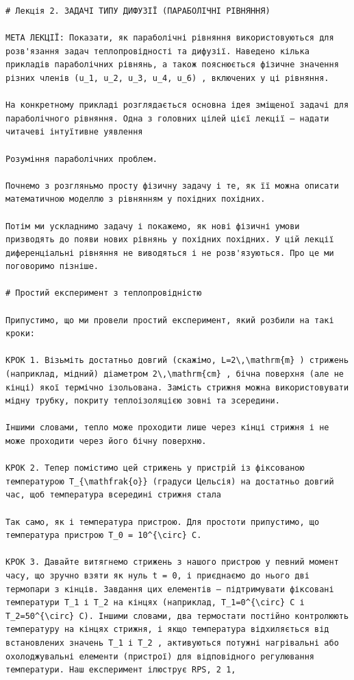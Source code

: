 \documentclass[
  ukrainian,
]{article}
\begin{document}
\begin{verbatim}
# Лекція 2. ЗАДАЧІ ТИПУ ДИФУЗІЇ (ПАРАБОЛІЧНІ РІВНЯННЯ)

МЕТА ЛЕКЦІЇ: Показати, як параболічні рівняння використовуються для розв'язання задач теплопровідності та дифузії. Наведено кілька прикладів параболічних рівнянь, а також пояснюється фізичне значення різних членів (u_1, u_2, u_3, u_4, u_6) , включених у ці рівняння.

На конкретному прикладі розглядається основна ідея зміщеної задачі для параболічного рівняння. Одна з головних цілей цієї лекції — надати читачеві інтуїтивне уявлення

Розуміння параболічних проблем.

Почнемо з розгляньмо просту фізичну задачу і те, як її можна описати математичною моделлю з рівнянням у похідних похідних.

Потім ми ускладнимо задачу і покажемо, як нові фізичні умови призводять до появи нових рівнянь у похідних похідних. У цій лекції диференціальні рівняння не виводяться і не розв'язуються. Про це ми поговоримо пізніше.

# Простий експеримент з теплопровідністю

Припустимо, що ми провели простий експеримент, який розбили на такі кроки:

КРОК 1. Візьміть достатньо довгий (скажімо, L=2\,\mathrm{m} ) стрижень (наприклад, мідний) діаметром 2\,\mathrm{cm} , бічна поверхня (але не кінці) якої термічно ізольована. Замість стрижня можна використовувати мідну трубку, покриту теплоізоляцією зовні та зсередини.

Іншими словами, тепло може проходити лише через кінці стрижня і не може проходити через його бічну поверхню.

КРОК 2. Тепер помістимо цей стрижень у пристрій із фіксованою температурою T_{\mathfrak{o}} (градуси Цельсія) на достатньо довгий час, щоб температура всередині стрижня стала

Так само, як і температура пристрою. Для простоти припустимо, що температура пристрою T_0 = 10^{\circ} C.

КРОК 3. Давайте витягнемо стрижень з нашого пристрою у певний момент часу, що зручно взяти як нуль t = 0, і приєднаємо до нього дві термопари з кінців. Завдання цих елементів — підтримувати фіксовані температури T_1 і T_2 на кінцях (наприклад, T_1=0^{\circ} C і T_2=50^{\circ} C). Іншими словами, два термостати постійно контролюють температуру на кінцях стрижня, і якщо температура відхиляється від встановлених значень T_1 і T_2 , активуються потужні нагрівальні або охолоджувальні елементи (пристрої) для відповідного регулювання температури. Наш експеримент ілюструє RPS, 2 1,


\end{verbatim}
\end{document}
